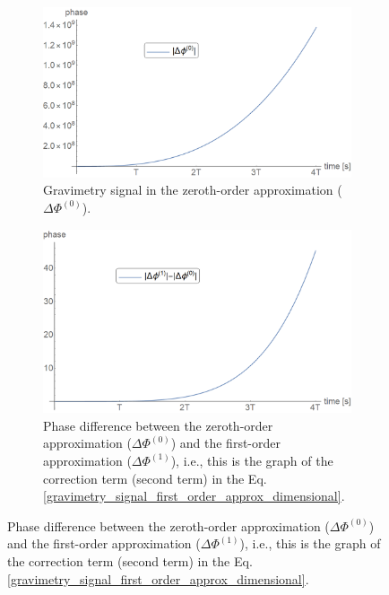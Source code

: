 \documentclass{article}
\begin{document}
\begin{figure}
     \centering
     \begin{subfigure}[b]{0.9\textwidth}
         \centering
         \includegraphics[width=\textwidth]{fase0order.png}
         \caption{Gravimetry signal in the zeroth-order approximation ($\Delta \Phi ^{(0)}$).}
         \label{fig:gravimetry_signal_zeroth_order}
     \end{subfigure}
     \hfill
     \begin{subfigure}[b]{0.9\textwidth}
         \centering
         \includegraphics[width=\textwidth]{phase0orderminus1order.png}
         \caption{Phase difference between the zeroth-order approximation ($\Delta \Phi ^{(0)}$) and the first-order approximation ($\Delta \Phi ^{(1)}$), i.e., this is the graph of the correction term (second term) in the Eq. \ref{gravimetry_signal_first_order_approx_dimensional}.}
         \label{fig:gravimetry_signal_first_minus_zeroth_order}
     \end{subfigure}
     \hfill

\end{figure}
\end{document}
